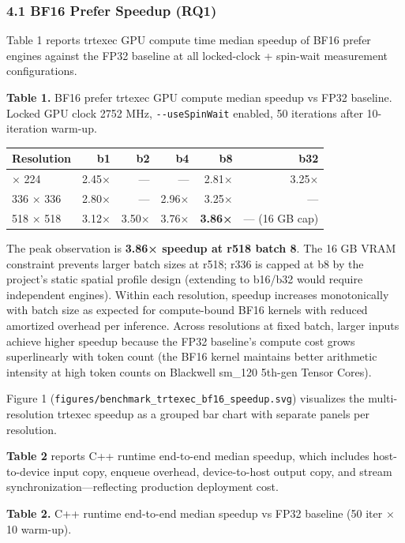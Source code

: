 \documentclass[
]{article}
\newcounter{none} %
\begin{document}
\subsubsection{4.1 BF16 Prefer Speedup
(RQ1)}\label{bf16-prefer-speedup-rq1}

Table 1 reports trtexec GPU compute time median speedup of BF16 prefer
engines against the FP32 baseline at all locked-clock + spin-wait
measurement configurations.

\textbf{Table 1.} BF16 prefer trtexec GPU compute median speedup vs FP32
baseline. Locked GPU clock 2752 MHz, \texttt{-\/-useSpinWait} enabled,
50 iterations after 10-iteration warm-up.

{\def\LTcaptype{none} %
\begin{longtable}[]{@{}lrrrrr@{}}
\toprule\noalign{}
Resolution & b1 & b2 & b4 & b8 & b32 \\
\midrule\noalign{}
\endhead
\bottomrule\noalign{}
\endlastfoot
224 × 224 & 2.45× & --- & --- & 2.81× & 3.25× \\
336 × 336 & 2.80× & --- & 2.96× & 3.25× & --- \\
518 × 518 & 3.12× & 3.50× & 3.76× & \textbf{3.86×} & --- (16 GB cap) \\
\end{longtable}
}

The peak observation is \textbf{3.86× speedup at r518 batch 8}. The 16
GB VRAM constraint prevents larger batch sizes at r518; r336 is capped
at b8 by the project's static spatial profile design (extending to
b16/b32 would require independent engines). Within each resolution,
speedup increases monotonically with batch size as expected for
compute-bound BF16 kernels with reduced amortized overhead per
inference. Across resolutions at fixed batch, larger inputs achieve
higher speedup because the FP32 baseline's compute cost grows
superlinearly with token count (the BF16 kernel maintains better
arithmetic intensity at high token counts on Blackwell sm\_120 5th-gen
Tensor Cores).

Figure 1 (\texttt{figures/benchmark\_trtexec\_bf16\_speedup.svg})
visualizes the multi-resolution trtexec speedup as a grouped bar chart
with separate panels per resolution.

\textbf{Table 2} reports C++ runtime end-to-end median speedup, which
includes host-to-device input copy, enqueue overhead, device-to-host
output copy, and stream synchronization---reflecting production
deployment cost.

\textbf{Table 2.} C++ runtime end-to-end median speedup vs FP32 baseline
(50 iter × 10 warm-up).
\end{document}
